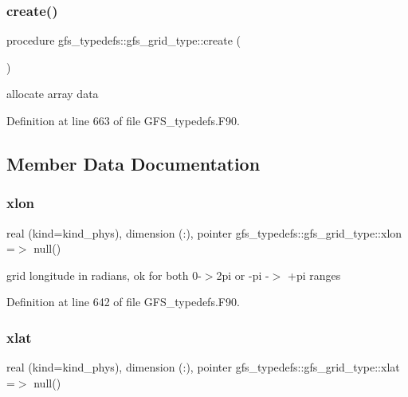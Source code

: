 \subsubsection{create()}
{\footnotesize\ttfamily procedure gfs\+\_\+typedefs\+::gfs\+\_\+grid\+\_\+type\+::create (\begin{DoxyParamCaption}{ }\end{DoxyParamCaption})}



allocate array data 



Definition at line 663 of file G\+F\+S\+\_\+typedefs.\+F90.



\subsection{Member Data Documentation}
\mbox{\label{structgfs__typedefs_1_1gfs__grid__type_a07da400c91533f7408379969c9aac4ba}} 
\subsubsection{xlon}
{\footnotesize\ttfamily real (kind=kind\+\_\+phys), dimension   (\+:), pointer gfs\+\_\+typedefs\+::gfs\+\_\+grid\+\_\+type\+::xlon =$>$ null()}



grid longitude in radians, ok for both 0-\/$>$2pi or -\/pi -\/$>$ +pi ranges 



Definition at line 642 of file G\+F\+S\+\_\+typedefs.\+F90.

\mbox{\label{structgfs__typedefs_1_1gfs__grid__type_a5275cf06912c067ed88fabae76dd8a7d}} 
\subsubsection{xlat}
{\footnotesize\ttfamily real (kind=kind\+\_\+phys), dimension   (\+:), pointer gfs\+\_\+typedefs\+::gfs\+\_\+grid\+\_\+type\+::xlat =$>$ null()}



